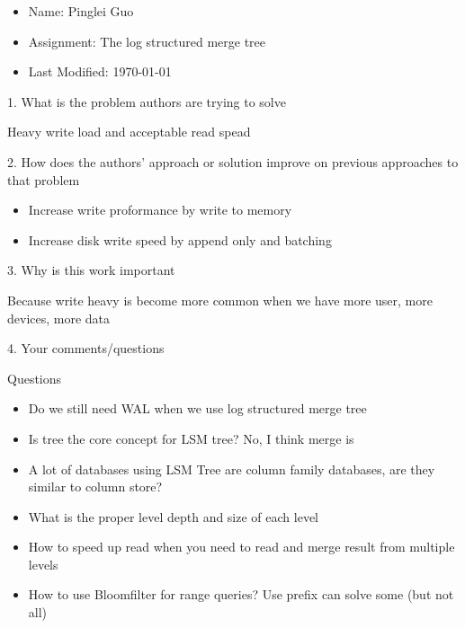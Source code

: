 \documentclass[12pt,a4paper,oneside]{article}
\begin{document}
\begin{itemize}
  \item Name: Pinglei Guo
  \item Assignment: The log structured merge tree
  \item Last Modified: \today
\end{itemize}

1. What is the problem authors are trying to solve

\medskip

Heavy write load and acceptable read spead

\bigskip

2. How does the authors’ approach or solution improve on previous approaches to that problem

\medskip

\begin{itemize}
  \item Increase write proformance by write to memory
  \item Increase disk write speed by append only and batching
\end{itemize}

\bigskip

3. Why is this work important

\medskip

Because write heavy is become more common when we have more user, more devices, more data

\bigskip

4. Your comments/questions

\medskip

Questions

\begin{itemize}
  \item Do we still need WAL when we use log structured merge tree
  \item Is tree the core concept for LSM tree? No, I think merge is
  \item A lot of databases using LSM Tree are column family databases, are they similar to column store?
  \item What is the proper level depth and size of each level
  \item How to speed up read when you need to read and merge result from multiple levels
  \item How to use Bloomfilter for range queries? Use prefix can solve some (but not all)
\end{itemize}
\end{document}
